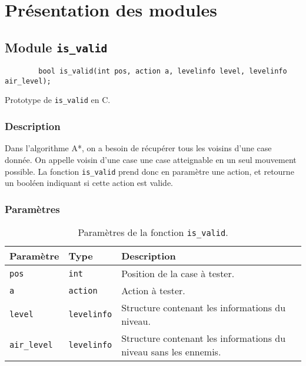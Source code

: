 \chapter{Présentation des modules}
\label{chap:presentation-modules}

\section{Module \texttt{is\_valid}}

\begin{listing}[!htpb]
    \begin{verbatim}
        bool is_valid(int pos, action a, levelinfo level, levelinfo air_level);
    \end{verbatim}
    \caption{Prototype de \texttt{is\_valid} en C.}
    \label{listing:c-is_valid-prototype}
\end{listing}

\subsection{Description}

Dans l'algorithme A*, on a besoin de récupérer tous les voisins d'une case donnée.
On appelle voisin d'une case une case atteignable en un seul mouvement possible.
\newline\newline
La fonction \texttt{is\_valid} prend donc en paramètre une action, et retourne un booléen indiquant si cette action est valide.

\subsection{Paramètres}

\begin{table}[!htpb]
    \label{tab:parameters-is_valid}
    \begin{tabularx}{\textwidth}{lXX}
        \toprule
        \textbf{Paramètre} & \textbf{Type} & \textbf{Description} \\
        \midrule
        \texttt{pos} & \texttt{int} & Position de la case à tester. \\
        \texttt{a} & \texttt{action} & Action à tester. \\
        \texttt{level} & \texttt{levelinfo} & Structure contenant les informations du niveau. \\
        \texttt{air\_level} & \texttt{levelinfo} & Structure contenant les informations du niveau sans les ennemis. \\
        \bottomrule
    \end{tabularx}
    \caption{Paramètres de la fonction \texttt{is\_valid}.}
\end{table}

